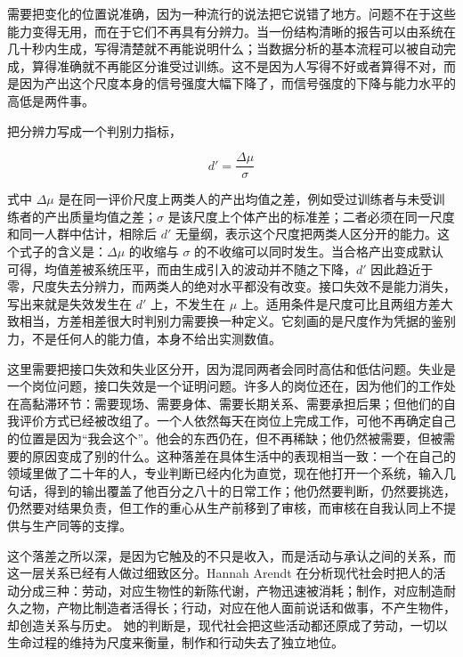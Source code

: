 
需要把变化的位置说准确，因为一种流行的说法把它说错了地方。问题不在于这些能力变得无用，而在于它们不再具有分辨力。当一份结构清晰的报告可以由系统在几十秒内生成，写得清楚就不再能说明什么；当数据分析的基本流程可以被自动完成，算得准确就不再能区分谁受过训练。这不是因为人写得不好或者算得不对，而是因为产出这个尺度本身的信号强度大幅下降了，而信号强度的下降与能力水平的高低是两件事。

把分辨力写成一个判别力指标，

\begin{equation}
d'=\frac{\Delta\mu}{\sigma}
\end{equation}

式中 $\Delta\mu$ 是在同一评价尺度上两类人的产出均值之差，例如受过训练者与未受训练者的产出质量均值之差；$\sigma$ 是该尺度上个体产出的标准差；二者必须在同一尺度和同一人群中估计，相除后 $d'$ 无量纲，表示这个尺度把两类人区分开的能力。这个式子的含义是：$\Delta\mu$ 的收缩与 $\sigma$ 的不收缩可以同时发生。当合格产出变成默认可得，均值差被系统压平，而由生成引入的波动并不随之下降，$d'$ 因此趋近于零，尺度失去分辨力，而两类人的绝对水平都没有改变。接口失效不是能力消失，写出来就是失效发生在 $d'$ 上，不发生在 $\mu$ 上。适用条件是尺度可比且两组方差大致相当，方差相差很大时判别力需要换一种定义。它刻画的是尺度作为凭据的鉴别力，不是任何人的能力值，本身不给出实测数值。

这里需要把接口失效和失业区分开，因为混同两者会同时高估和低估问题。失业是一个岗位问题，接口失效是一个证明问题。许多人的岗位还在，因为他们的工作处在高黏滞环节：需要现场、需要身体、需要长期关系、需要承担后果；但他们的自我评价方式已经被改组了。一个人依然每天在岗位上完成工作，可他不再确定自己的位置是因为“我会这个”。他会的东西仍在，但不再稀缺；他仍然被需要，但被需要的原因变成了别的什么。这种落差在具体生活中的表现相当一致：一个在自己的领域里做了二十年的人，专业判断已经内化为直觉，现在他打开一个系统，输入几句话，得到的输出覆盖了他百分之八十的日常工作；他仍然要判断，仍然要挑选，仍然要对结果负责，但工作的重心从生产前移到了审核，而审核在自我认同上不提供与生产同等的支撑。


这个落差之所以深，是因为它触及的不只是收入，而是活动与承认之间的关系，而这一层关系已经有人做过细致区分。Hannah Arendt 在分析现代社会时把人的活动分成三种：劳动，对应生物性的新陈代谢，产物迅速被消耗；制作，对应制造耐久之物，产物比制造者活得长；行动，对应在他人面前说话和做事，不产生物件，却创造关系与历史。\cite{arendt1958human} 她的判断是，现代社会把这些活动都还原成了劳动，一切以生命过程的维持为尺度来衡量，制作和行动失去了独立地位。


